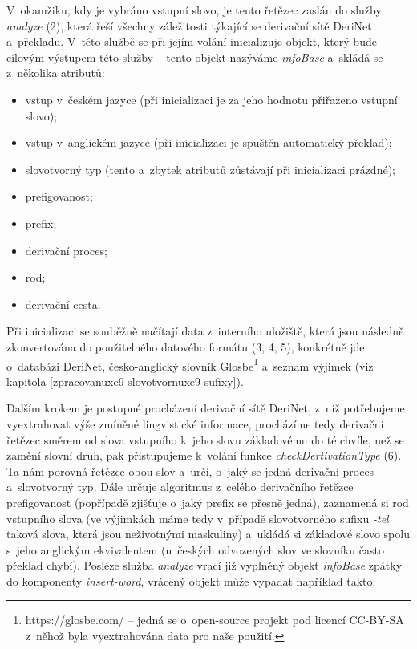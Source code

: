 V~okamžiku, kdy je vybráno vstupní slovo, je tento řetězec zaslán do
služby \emph{analyze} (2), která řeší všechny záležitosti týkající se
derivační sítě DeriNet a~překladu. V~této službě se při jejím volání
inicializuje objekt, který bude cílovým výstupem této služby -- tento
objekt nazýváme \emph{infoBase} a~skládá se z~několika atributů:

\begin{itemize}
\tightlist
\item
  vstup v~českém jazyce (při inicializaci je za jeho hodnotu přiřazeno
  vstupní slovo);
\item
  vstup v~anglickém jazyce (při inicializaci je spuštěn automatický
  překlad);
\item
  slovotvorný typ (tento a~zbytek atributů zůstávají při inicializaci
  prázdné);
\item
  prefigovanost;
\item
  prefix;
\item
  derivační proces;
\item
  rod;
\item
  derivační cesta.
\end{itemize}

Při inicializaci se souběžně načítají data z~interního uložiště, která
jsou následně zkonvertována do použitelného datového formátu (3, 4, 5),
konkrétně jde o~databázi DeriNet, česko-anglický slovník
Glosbe\footnote{https://glosbe.com/ -- jedná se o~open-source projekt pod licencí CC-BY-SA z~něhož byla vyextrahována data pro naše použití.}
a~seznam výjimek (viz kapitola
\ref{zpracovanuxe9-slovotvornuxe9-sufixy}).

Dalším krokem je postupné procházení derivační sítě DeriNet, z~níž
potřebujeme vyextrahovat výše zmíněné lingvistické informace, procházíme
tedy derivační řetězec směrem od slova vstupního k~jeho slovu
základovému do té chvíle, než se zamění slovní druh, pak přistupujeme
k~volání funkce \emph{checkDertivationType} (6). Ta nám porovná řetězce
obou slov a~určí, o~jaký se jedná derivační proces a~slovotvorný typ.
Dále určuje algoritmus z~celého derivačního řetězce prefigovanost
(popřípadě zjišťuje o~jaký prefix se přesně jedná), zaznamená si rod
vstupního slova (ve výjimkách máme tedy v~případě slovotvorného sufixu
\emph{-tel} taková slova, která jsou neživotnými maskuliny) a~ukládá si
základové slovo spolu s~jeho anglickým ekvivalentem (u~českých
odvozených slov ve slovníku často překlad chybí). Posléze služba
\emph{analyze} vrací již vyplněný objekt \emph{infoBase} zpátky do
komponenty \emph{insert-word}, vrácený objekt může vypadat například
takto:

